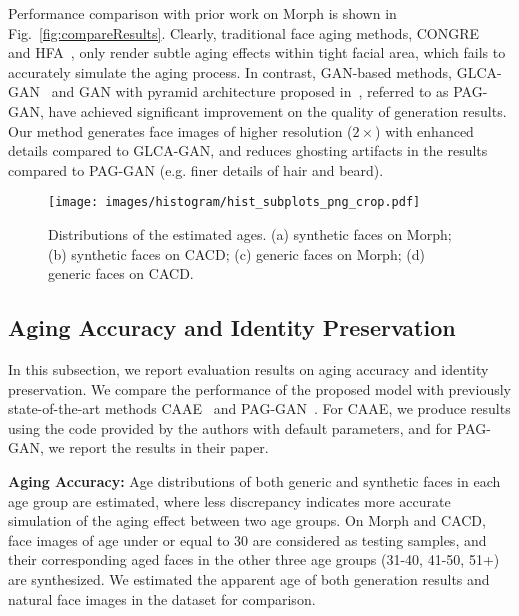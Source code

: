 \documentclass[letterpaper]{article} %
\begin{document}
Performance comparison with prior work on Morph is shown in Fig.~\ref{fig:compareResults}. Clearly, traditional face aging methods, CONGRE~\cite{suo2012concatenational} and HFA~\cite{yang2016face}, only render subtle aging effects within tight facial area, which fails to accurately simulate the aging process.
In contrast, GAN-based methods, GLCA-GAN~\cite{li2018global} and GAN with pyramid architecture proposed in~\cite{yang2017learning}, referred to as PAG-GAN, have achieved significant improvement on the quality of generation results. 
Our method generates face images of higher resolution ($2\times$) with enhanced details compared to GLCA-GAN, and reduces ghosting artifacts in the results compared to PAG-GAN (e.g. finer details of hair and beard).

\begin{figure}[ht]
\centering\texttt{[image: images/histogram/hist\_subplots\_png\_crop.pdf]}
\caption{Distributions of the estimated ages. (a) synthetic faces on Morph; (b) synthetic faces on CACD; (c) generic faces on Morph; (d) generic faces on CACD.}
\label{fig:histAgeEst}
\end{figure}

\subsection{Aging Accuracy and Identity Preservation}
In this subsection, we report evaluation results on aging accuracy and identity preservation. We compare the performance of the proposed model with previously state-of-the-art methods CAAE~\cite{zhang2017age} and PAG-GAN~\cite{yang2017learning}. 
For CAAE, we produce results using the code provided by the authors with default parameters, and for PAG-GAN, we report the results in their paper.

\textbf{Aging Accuracy:} Age distributions of both generic and synthetic faces in each age group are estimated, where less discrepancy indicates more accurate simulation of the aging effect between two age groups. 
On Morph and CACD, face images of age under or equal to 30 are considered as testing samples, and their corresponding aged faces in the other three age groups (31-40, 41-50, 51+) are synthesized. 
We estimated the apparent age of both generation results and natural face images in the dataset for comparison.
\end{document}

